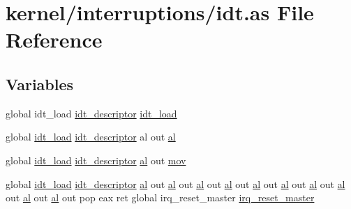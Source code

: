 \hypertarget{idt_8as}{}\section{kernel/interruptions/idt.as File Reference}
\label{idt_8as}
\subsection*{Variables}
\begin{DoxyCompactItemize}
\item 
global idt\+\_\+load \hyperlink{interruption_8c_a9ce429b2fa8415fadf0a955cddaeea9d}{idt\+\_\+descriptor} \hyperlink{idt_8as_a792b9114aca62725df021c6c6c4eb027}{idt\+\_\+load}
\item 
global \hyperlink{interruption_8c_ac32911224d6d0fd8e287f2e021ee3ba4}{idt\+\_\+load} \hyperlink{interruption_8c_a9ce429b2fa8415fadf0a955cddaeea9d}{idt\+\_\+descriptor} al out \hyperlink{idt_8as_a55801884e6527c2d735351b4d6b66caf}{al}
\item 
global \hyperlink{interruption_8c_ac32911224d6d0fd8e287f2e021ee3ba4}{idt\+\_\+load} \hyperlink{interruption_8c_a9ce429b2fa8415fadf0a955cddaeea9d}{idt\+\_\+descriptor} \hyperlink{isrs_8as_a55801884e6527c2d735351b4d6b66caf}{al} out \hyperlink{idt_8as_a3ca38a9ff3527e8845b56e9de4e66b0d}{mov}
\item 
global \hyperlink{interruption_8c_ac32911224d6d0fd8e287f2e021ee3ba4}{idt\+\_\+load} \hyperlink{interruption_8c_a9ce429b2fa8415fadf0a955cddaeea9d}{idt\+\_\+descriptor} \hyperlink{isrs_8as_a55801884e6527c2d735351b4d6b66caf}{al} out \hyperlink{isrs_8as_a55801884e6527c2d735351b4d6b66caf}{al} out \hyperlink{isrs_8as_a55801884e6527c2d735351b4d6b66caf}{al} out \hyperlink{isrs_8as_a55801884e6527c2d735351b4d6b66caf}{al} out \hyperlink{isrs_8as_a55801884e6527c2d735351b4d6b66caf}{al} out \hyperlink{isrs_8as_a55801884e6527c2d735351b4d6b66caf}{al} out \hyperlink{isrs_8as_a55801884e6527c2d735351b4d6b66caf}{al} out \hyperlink{isrs_8as_a55801884e6527c2d735351b4d6b66caf}{al} out \hyperlink{isrs_8as_a55801884e6527c2d735351b4d6b66caf}{al} out \hyperlink{isrs_8as_a55801884e6527c2d735351b4d6b66caf}{al} out pop eax ret global irq\+\_\+reset\+\_\+master \hyperlink{idt_8as_ae016f971a439a159c81f4dea5c049163}{irq\+\_\+reset\+\_\+master}
\item 

\end{DoxyCompactItemize}
